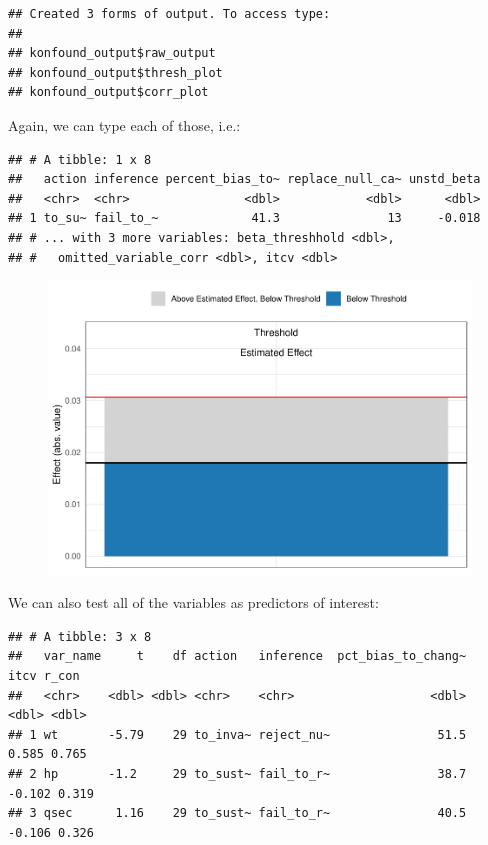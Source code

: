 \documentclass[man]{apa6}
\theoremstyle{definition}
\theoremstyle{definition}
\theoremstyle{definition}
\theoremstyle{remark}
\begin{document}
\begin{verbatim}
## Created 3 forms of output. To access type: 
## 
## konfound_output$raw_output
## konfound_output$thresh_plot
## konfound_output$corr_plot
\end{verbatim}

Again, we can type each of those, i.e.:

\begin{verbatim}
## # A tibble: 1 x 8
##   action inference percent_bias_to~ replace_null_ca~ unstd_beta
##   <chr>  <chr>                <dbl>            <dbl>      <dbl>
## 1 to_su~ fail_to_~             41.3               13     -0.018
## # ... with 3 more variables: beta_threshhold <dbl>,
## #   omitted_variable_corr <dbl>, itcv <dbl>
\end{verbatim}

\begin{figure}
\centering
\includegraphics{papaja_files/figure-latex/unnamed-chunk-12-1.pdf}
\caption{}
\end{figure}

We can also test all of the variables as predictors of interest:

\begin{verbatim}
## # A tibble: 3 x 8
##   var_name     t    df action   inference  pct_bias_to_chang~   itcv r_con
##   <chr>    <dbl> <dbl> <chr>    <chr>                   <dbl>  <dbl> <dbl>
## 1 wt       -5.79    29 to_inva~ reject_nu~               51.5  0.585 0.765
## 2 hp       -1.2     29 to_sust~ fail_to_r~               38.7 -0.102 0.319
## 3 qsec      1.16    29 to_sust~ fail_to_r~               40.5 -0.106 0.326
\end{verbatim}
\end{document}
